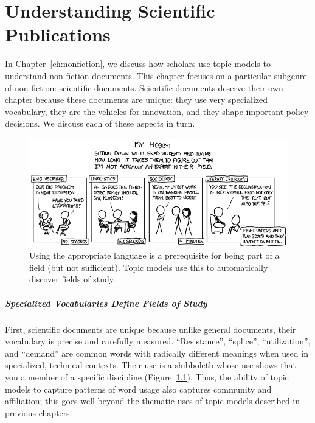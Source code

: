 

\chapter{Understanding Scientific Publications}
\label{ch:sci}

In Chapter~\ref{ch:nonfiction}, we discuss how scholars use topic models to understand
non-fiction documents.  This chapter focuses on a particular subgenre of
non-fiction: scientific documents.  Scientific documents deserve their own
chapter because these documents are unique: they use very specialized
vocabulary, they are the vehicles for innovation, and they shape important
policy decisions.  We discuss each of these aspects in turn.

\begin{figure}
\includegraphics[width=\linewidth]{figures/sci_faking}
\caption{Using the appropriate language is a prerequisite for being
  part of a field (but not sufficient).  Topic models use this to
  automatically discover fields of study.}
\label{fig:faking}
\end{figure}

\paragraph{Specialized Vocabularies Define Fields of Study}

First, scientific documents are unique because unlike general documents,
their vocabulary is precise and carefully measured.  ``Resistance'', ``splice'',
``utilization'', and ``demand'' are common words with radically different
meanings when used in specialized, technical contexts.  Their use is a
shibboleth whose use shows that you a member of a specific discipline
(Figure~\ref{fig:faking}).  Thus, the ability of topic models to capture
patterns of word usage also captures community and affiliation; this goes well
beyond the thematic uses of topic models described in previous chapters.


